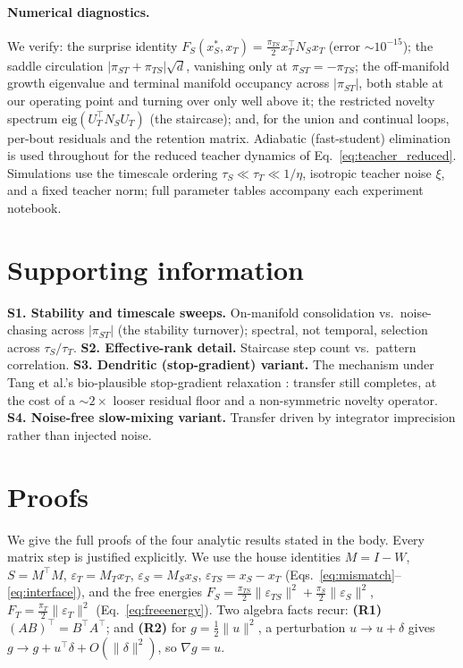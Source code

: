 \documentclass[10pt,letterpaper]{article}
\theoremstyle{plain}
\theoremstyle{remark}
\newcommand{\eps}{\varepsilon}
\newcommand{\xT}{x_T}
\newcommand{\xS}{x_S}
\newcommand{\MT}{M_T}
\newcommand{\MS}{M_S}
\newcommand{\NS}{N_S}
\newcommand{\FS}{F_S}
\newcommand{\FT}{F_T}
\newcommand{\epsT}{\eps_T}
\newcommand{\epsS}{\eps_S}
\newcommand{\epsTS}{\eps_{TS}}
\newcommand{\piT}{\pi_T}
\newcommand{\piS}{\pi_S}
\newcommand{\piTS}{\pi_{TS}}
\newcommand{\piST}{\pi_{ST}}
\newcommand{\tauT}{\tau_T}
\newcommand{\tauS}{\tau_S}
\newcommand{\UT}{U_T}
\newcommand{\tr}{^{\!\top}}
\begin{document}
\paragraph{Numerical diagnostics.} We verify: the surprise identity
$\FS(\xS^*,\xT)=\tfrac{\piTS}{2}\xT\tr\NS\xT$ (error $\sim10^{-15}$); the saddle circulation
$|\piST+\piTS|\sqrt{d}$, vanishing only at $\piST=-\piTS$; the off-manifold growth eigenvalue and terminal
manifold occupancy across $|\piST|$, both stable at our operating point and turning over only well
above it; the restricted novelty spectrum
$\mathrm{eig}(\UT\tr\NS\UT)$ (the staircase); and, for the union and continual loops, per-bout residuals
and the retention matrix. Adiabatic (fast-student) elimination is used throughout for the reduced teacher
dynamics of Eq.~\eqref{eq:teacher_reduced}. Simulations use the timescale ordering
$\tauS\ll\tauT\ll 1/\eta$, isotropic teacher noise $\xi$, and a fixed teacher norm; full parameter tables
accompany each experiment notebook.

\section*{Supporting information}
\textbf{S1. Stability and timescale sweeps.} On-manifold consolidation vs.\ noise-chasing across
$|\piST|$ (the stability turnover); spectral, not temporal, selection across $\tauS/\tauT$.
\textbf{S2. Effective-rank detail.} Staircase step count vs.\ pattern correlation.
\textbf{S3. Dendritic (stop-gradient) variant.} The mechanism under Tang et al.'s bio-plausible
stop-gradient relaxation \cite{tang2023covpcn}: transfer still completes, at the cost of a
$\sim\!2\times$ looser residual floor and a non-symmetric novelty operator.
\textbf{S4. Noise-free slow-mixing variant.} Transfer driven by integrator imprecision rather than
injected noise.

\appendix
\section{Proofs}
\label{app:proofs}
We give the full proofs of the four analytic results stated in the body. Every matrix step is
justified explicitly. We use the house identities $M=I-W$, $S=M\tr M$, $\epsT=\MT\xT$, $\epsS=\MS\xS$,
$\epsTS=\xS-\xT$ (Eqs.~\ref{eq:mismatch}--\ref{eq:interface}), and the free energies
$\FS=\tfrac{\piTS}{2}\|\epsTS\|^2+\tfrac{\piS}{2}\|\epsS\|^2$, $\FT=\tfrac{\piT}{2}\|\epsT\|^2$
(Eq.~\ref{eq:freeenergy}). Two algebra facts recur: \textbf{(R1)} $(AB)\tr=B\tr A\tr$; and
\textbf{(R2)} for $g=\tfrac12\|u\|^2$, a perturbation $u\to u+\delta$ gives $g\to g+u\tr\delta+O(\|\delta\|^2)$,
so $\nabla g=u$.
\end{document}
